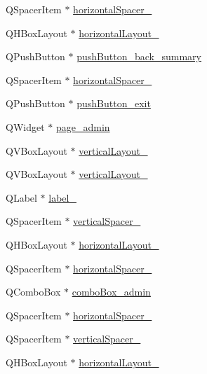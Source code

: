 \begin{DoxyCompactItemize}
\item 
Q\+Spacer\+Item $\ast$ \hyperlink{class_ui___main_window_a482e23eb73c50451a16ca22e49b46686}{horizontal\+Spacer\+\_}
\item 
Q\+H\+Box\+Layout $\ast$ \hyperlink{class_ui___main_window_a1e64a8da62994a2cb0ff65f32b26639e}{horizontal\+Layout\+\_}
\item 
Q\+Push\+Button $\ast$ \hyperlink{class_ui___main_window_a9d1e5fb7f671a24cc2059a65b2ab4f14}{push\+Button\+\_\+back\+\_\+summary}
\item 
Q\+Spacer\+Item $\ast$ \hyperlink{class_ui___main_window_ad977263554f6a5b422f205fe349c84e4}{horizontal\+Spacer\+\_}
\item 
Q\+Push\+Button $\ast$ \hyperlink{class_ui___main_window_aac9fabba2c79c5c365d838576a5c1a23}{push\+Button\+\_\+exit}
\item 
Q\+Widget $\ast$ \hyperlink{class_ui___main_window_abd6972986b96b126a726ebf5f8520188}{page\+\_\+admin}
\item 
Q\+V\+Box\+Layout $\ast$ \hyperlink{class_ui___main_window_ae5f4dafa4f99b3990c864f0bc54cc87d}{vertical\+Layout\+\_}
\item 
Q\+V\+Box\+Layout $\ast$ \hyperlink{class_ui___main_window_ad9eb495f2ef1fdec850aca1c0ea2088c}{vertical\+Layout\+\_}
\item 
Q\+Label $\ast$ \hyperlink{class_ui___main_window_acf6fc9bce4db154fecbd1ff532918353}{label\+\_}
\item 
Q\+Spacer\+Item $\ast$ \hyperlink{class_ui___main_window_a3360ffbe23e164d5a4f48e918502d2c7}{vertical\+Spacer\+\_}
\item 
Q\+H\+Box\+Layout $\ast$ \hyperlink{class_ui___main_window_a683a8bf72fc53fccc1e26a811a89095b}{horizontal\+Layout\+\_}
\item 
Q\+Spacer\+Item $\ast$ \hyperlink{class_ui___main_window_a8ab47ff95482ef95f4ec6ca4766b4f73}{horizontal\+Spacer\+\_}
\item 
Q\+Combo\+Box $\ast$ \hyperlink{class_ui___main_window_a1bced6411925edb685794e836e50995f}{combo\+Box\+\_\+admin}
\item 
Q\+Spacer\+Item $\ast$ \hyperlink{class_ui___main_window_ae68be49729f967fb48d4c6ed6531a1f8}{horizontal\+Spacer\+\_}
\item 
Q\+Spacer\+Item $\ast$ \hyperlink{class_ui___main_window_adf9195da7a95d53a202587e218c16f45}{vertical\+Spacer\+\_}
\item 
Q\+H\+Box\+Layout $\ast$ \hyperlink{class_ui___main_window_a5a19bc8cf16dd2fbfa87ddaec41e2d75}{horizontal\+Layout\+\_}

\end{DoxyCompactItemize}
